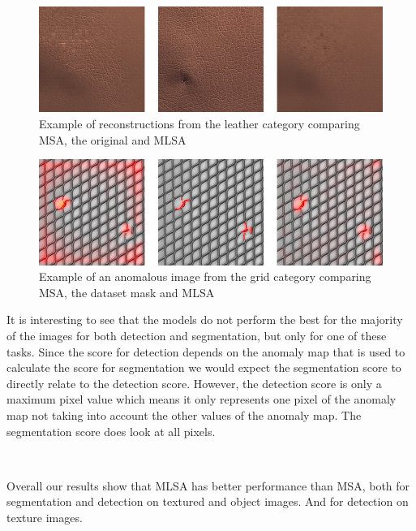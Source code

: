 \begin{figure}[ht!]
\centering
\includegraphics[width=\textwidth]{imgs/samples/leather_poke_recon.jpg}
\caption{Example of reconstructions from the leather category comparing MSA, the original and MLSA}
\label{fig:results:leather-recon}
\end{figure}

\begin{figure}[ht!]
\centering
\includegraphics[width=\textwidth]{imgs/samples/grid_broken_anomap.jpg}
\caption{Example of an anomalous image from the grid category comparing MSA, the dataset mask and MLSA}
\label{fig:results:grid-anomap}
\end{figure}

It is interesting to see that the models do not perform the best for the majority of the images for both detection and segmentation, but only for one of these tasks. Since the score for detection depends on the anomaly map that is used to calculate the score for segmentation we would expect the segmentation score to directly relate to the detection score. However, the detection score is only a maximum pixel value which means it only represents one pixel of the anomaly map not taking into account the other values of the anomaly map. The segmentation score does look at all pixels.



\

Overall our results show that MLSA has better performance than MSA, both for segmentation and detection on textured and object images. And for detection on texture images.

